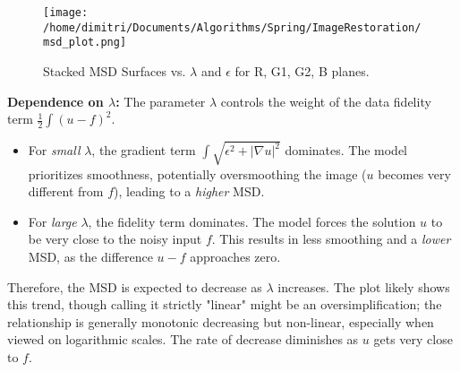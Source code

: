 \documentclass{article}
\begin{document}
	\begin{figure}[h!]
		\centering
		\texttt{[image: /home/dimitri/Documents/Algorithms/Spring/ImageRestoration/msd\_plot.png]}
		\caption{Stacked MSD Surfaces vs. $\lambda$ and $\epsilon$ for R, G1, G2, B planes.}
		\label{fig:msd_plot}
	\end{figure}
	
	\textbf{Dependence on $\lambda$:}
	The parameter $\lambda$ controls the weight of the data fidelity term $\frac{1}{2} \int (u-f)^2$.
	\begin{itemize}
		\item For \textit{small} $\lambda$, the gradient term $\int \sqrt{\epsilon^2 + |\nabla u|^2}$ dominates. The model prioritizes smoothness, potentially oversmoothing the image ($u$ becomes very different from $f$), leading to a \textit{higher} MSD.
		\item For \textit{large} $\lambda$, the fidelity term dominates. The model forces the solution $u$ to be very close to the noisy input $f$. This results in less smoothing and a \textit{lower} MSD, as the difference $u-f$ approaches zero.
	\end{itemize}
	Therefore, the MSD is expected to decrease as $\lambda$ increases. The plot likely shows this trend, though calling it strictly "linear" might be an oversimplification; the relationship is generally monotonic decreasing but non-linear, especially when viewed on logarithmic scales. The rate of decrease diminishes as $u$ gets very close to $f$.
	
\end{document}

